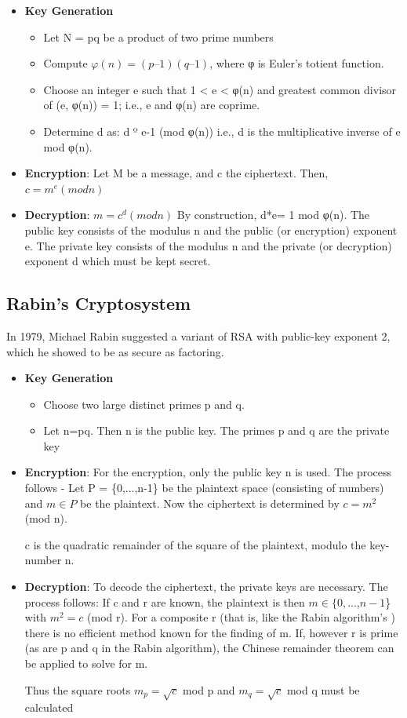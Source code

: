 \documentclass[12pt]{article} %
\begin{document}
\begin{itemize}
\item{\textbf{Key Generation}}
\begin{itemize}
\item{}Let N = pq be a product of two prime numbers
\item{}Compute $φ(n) = (p – 1)(q – 1)$, where φ is Euler's totient function.
\item{}Choose an integer e such that 1 < e < φ(n) and greatest common divisor of (e, φ(n)) = 1; i.e., e and φ(n) are coprime.
\item{}Determine d as: d º e-1 (mod φ(n)) i.e., d is the multiplicative inverse of e mod φ(n).
 \end{itemize}

\item{\textbf{Encryption}}:    Let M be a message, and c the ciphertext. Then,
        	$c = m^e (mod n)$
\item{\textbf{Decryption}}:  $m = c^d (mod n)$
By construction, d*e= 1 mod φ(n). The public key consists of the modulus n and the public (or encryption) exponent e. The private key consists of the modulus n and the private (or decryption) exponent d which must be kept secret.
\end{itemize}
\subsection{Rabin’s Cryptosystem}
In 1979, Michael Rabin suggested a variant of RSA with public-key exponent 2, which he showed to be as secure as factoring.
\begin{itemize}
\item{\textbf{Key Generation}}
\begin{itemize}
\item{}Choose two large distinct primes p and q.
\item{}Let n=pq. Then n is the public key. The primes p and q are the private key
 \end{itemize}

\item{\textbf{Encryption}}:  For the encryption, only the public key n is used. The process follows -
Let  P = \{0,...,n-1\} be the plaintext space (consisting of numbers) and $m \in P$ be the plaintext. Now the ciphertext  is determined by $c = m^2 $(mod n).


c is the quadratic remainder of the square of the plaintext, modulo the key-number n.
\item{\textbf{Decryption}}:
To decode the ciphertext, the private keys are necessary. The process follows:
If c and r are known, the plaintext is then $m \in \{0,$...,$n-1$\} with $m^2=c$ (mod r). For a composite r (that is, like the Rabin algorithm's ) there is no efficient method known for the finding of m. If, however r is prime (as are p and q in the Rabin algorithm), the Chinese remainder theorem can be applied to solve for m.

Thus the square roots
$ m_p = \sqrt{c}$ mod p
and
$ m_q = \sqrt{c}$ mod q must be calculated
\end{itemize}
\end{document}
